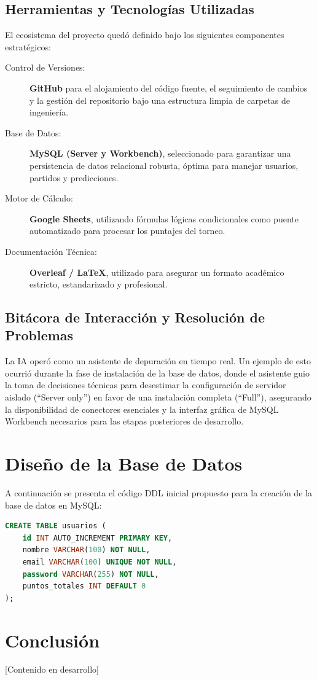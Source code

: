 \documentclass[12pt, a4paper]{article}
\begin{document}
\subsection{Herramientas y Tecnologías Utilizadas}
El ecosistema del proyecto quedó definido bajo los siguientes componentes estratégicos:
\begin{description}
    \item[Control de Versiones:] \textbf{GitHub} para el alojamiento del código fuente, el seguimiento de cambios y la gestión del repositorio bajo una estructura limpia de carpetas de ingeniería.
    \item[Base de Datos:] \textbf{MySQL (Server y Workbench)}, seleccionado para garantizar una persistencia de datos relacional robusta, óptima para manejar usuarios, partidos y predicciones.
    \item[Motor de Cálculo:] \textbf{Google Sheets}, utilizando fórmulas lógicas condicionales como puente automatizado para procesar los puntajes del torneo.
    \item[Documentación Técnica:] \textbf{Overleaf / \LaTeX}, utilizado para asegurar un formato académico estricto, estandarizado y profesional.
\end{description}

\subsection{Bitácora de Interacción y Resolución de Problemas}
La IA operó como un asistente de depuración en tiempo real. Un ejemplo de esto ocurrió durante la fase de instalación de la base de datos, donde el asistente guio la toma de decisiones técnicas para desestimar la configuración de servidor aislado (``Server only'') en favor de una instalación completa (``Full''), asegurando la disponibilidad de conectores esenciales y la interfaz gráfica de MySQL Workbench necesarios para las etapas posteriores de desarrollo.

\section{Diseño de la Base de Datos}
A continuación se presenta el código DDL inicial propuesto para la creación de la base de datos en MySQL:

\begin{lstlisting}[language=SQL, caption=Estructura base de la tabla usuarios]
CREATE TABLE usuarios (
    id INT AUTO_INCREMENT PRIMARY KEY,
    nombre VARCHAR(100) NOT NULL,
    email VARCHAR(100) UNIQUE NOT NULL,
    password VARCHAR(255) NOT NULL,
    puntos_totales INT DEFAULT 0
);
\end{lstlisting}

\section{Conclusión}
[Contenido en desarrollo]
\end{document}
